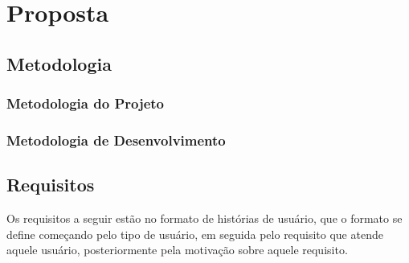 \chapter[Proposta]{Proposta}


\section{Metodologia}

    \subsection{Metodologia do Projeto}
    
    \subsection{Metodologia de Desenvolvimento}
    
\section{Requisitos}

Os requisitos a seguir estão no formato de histórias de usuário, que o formato se define começando pelo tipo de usuário, em seguida pelo requisito que atende aquele usuário, posteriormente pela motivação sobre aquele requisito.

